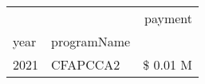 \begin{tabular}{llr}
\toprule
 &  & payment \\
year & programName &  \\
\midrule
2021 & CFAPCCA2 & \$ 0.01 M \\
\cline{1-3}
\bottomrule
\end{tabular}

